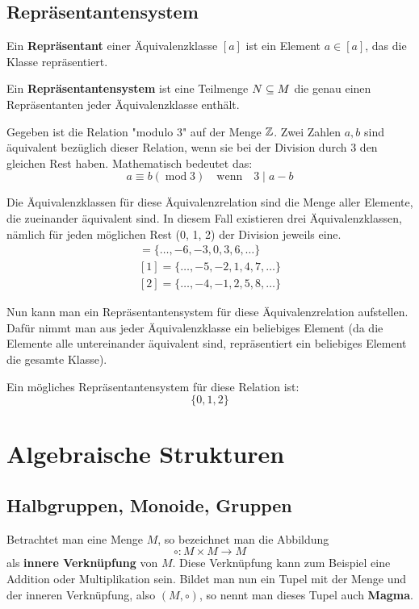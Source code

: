 \documentclass[11pt]{article}
\begin{document}
\subsection{Repräsentantensystem}
Ein \textbf{Repräsentant} einer Äquivalenzklasse $[a]$ ist ein Element $a \in [a]$, das die Klasse repräsentiert.

Ein \textbf{Repräsentantensystem} ist eine Teilmenge $N \subseteq M$ die genau einen Repräsentanten jeder Äquivalenzklasse
enthält.

\begin{bsp}
  Gegeben ist die Relation "modulo 3" auf der Menge $\mathbb{Z}$. Zwei Zahlen $a, b$ sind äquivalent bezüglich dieser Relation,
  wenn sie bei der Division durch 3 den gleichen Rest haben. Mathematisch bedeutet das:
  \[
    a \equiv b(\operatorname{mod} 3) \quad \text{wenn}\quad 3\mid a-b
  \]

  Die Äquivalenzklassen für diese Äquivalenzrelation sind die Menge aller Elemente, die zueinander äquivalent sind.
  In diesem Fall existieren drei Äquivalenzklassen, nämlich für jeden möglichen Rest (0, 1, 2) der Division jeweils eine.
  \begin{align*}
    [0] = \{\ldots, -6, -3, 0, 3, 6, \ldots\} \\
    [1] = \{\ldots, -5, -2, 1, 4, 7, \ldots\} \\
    [2] = \{\ldots, -4, -1, 2, 5, 8, \ldots\}
  \end{align*}

  Nun kann man ein Repräsentantensystem für diese Äquivalenzrelation aufstellen. Dafür nimmt man aus jeder Äquivalenzklasse
  ein beliebiges Element (da die Elemente alle untereinander äquivalent sind, repräsentiert ein beliebiges Element die
  gesamte Klasse).

  Ein mögliches Repräsentantensystem für diese Relation ist:
  \[
    \{0, 1, 2\}
  \]
\end{bsp}

\section{Algebraische Strukturen}
\subsection{Halbgruppen, Monoide, Gruppen}
Betrachtet man eine Menge $M$, so bezeichnet man die Abbildung
\[
  \circ : M \times M \longrightarrow M
\]
als \textbf{innere Verknüpfung} von $M$. Diese Verknüpfung kann zum Beispiel eine Addition oder Multiplikation sein.
Bildet man nun ein Tupel mit der Menge und der inneren Verknüpfung, also $(M, \circ)$, so nennt man dieses Tupel auch
\textbf{Magma}.
\end{document}
